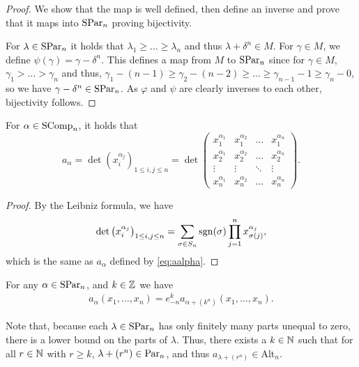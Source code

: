 \documentclass[11pt]{amsart}
\begin{document}
\begin{proof}
    We show that the map is well defined, then define an inverse and prove that it maps into $\mathrm{SPar}_n$ proving bijectivity.

    For $\lambda \in \mathrm{SPar}_n$ it holds that $\lambda_1 \geq \ldots \geq \lambda_n$ and thus $\lambda + \delta^n \in M$. 
    For $\gamma \in M$, we define $\psi(\gamma) = \gamma - \delta^n $. This defines a map from $M $ to $\mathrm{SPar}_n$ since for $\gamma \in M $, $\gamma_1 > \ldots > \gamma_n$ and thus, $\gamma_1 - (n-1) \geq \gamma_{2} - (n-2) \geq \ldots \geq \gamma_{n-1} - 1 \geq \gamma_n - 0  $,
    so we have $\gamma - \delta^n \in \mathrm{SPar}_n$. 
    As $\varphi$ and $\psi $ are clearly inverses to each other, bijectivity follows.
\end{proof}
\begin{lem}\label{lem:altdet}
    For $\alpha \in \mathrm{SComp}_n$, it holds that 
    \begin{equation}\label{eq:avocado}
        a_{\alpha} = \det(x_i^{\alpha_j})_{1\leq i,j\leq n} = \det \begin{pmatrix}
            x_1^{\alpha_1} & x_1^{\alpha_2} & \dots &x_1^{\alpha_n}\\x_2^{\alpha_1} & x_2^{\alpha_2} & \dots & x_2^{\alpha_n}\\
            \vdots &\vdots & \ddots & \vdots\\
            x_n^{\alpha_1} & x_n^{\alpha_2} & \dots & x_n^{\alpha_n}
        \end{pmatrix}.   \end{equation} 
\end{lem}
\begin{proof}
By the Leibniz formula, we have
\[\det\left(x_i^{\alpha_j}\right)_{1\leq i,j\leq n}=\sum_{\sigma\in S_n}\mathrm{sgn}(\sigma)\prod_{j=1}^nx_{\sigma(j)}^{\alpha_j},\]
which is the same as $a_\alpha$ defined by \cref{eq:aalpha}. 
\end{proof}

\begin{cor}\label{cor:ea}
    For any $\alpha \in \mathrm{SPar}_n$, and $k \in \mathbb{Z}$ we have
    \begin{align}\label{eq:toast}
        a_{\alpha}(x_1,\dots, x_n) = e_{-n}^ka_{\alpha + (k^n)}(x_1,\dots,x_n).
    \end{align}
\end{cor}

\begin{rem}\label{rem:LS-nonLS}
Note that, because each $\lambda \in \mathrm{SPar}_n$ has only finitely many parts unequal to zero, there is a lower bound on the parts of $\lambda$. Thus, there exists a $k \in \mathbb{N}$ such that for all $r\in \mathbb{N}$ with $r\geq k$, $\lambda+(r^n) \in \mathrm{Par}_n$, and thus $a_{\lambda + (r^n)} \in \mathrm{Alt}_n$.
\end{rem}
\end{document}
